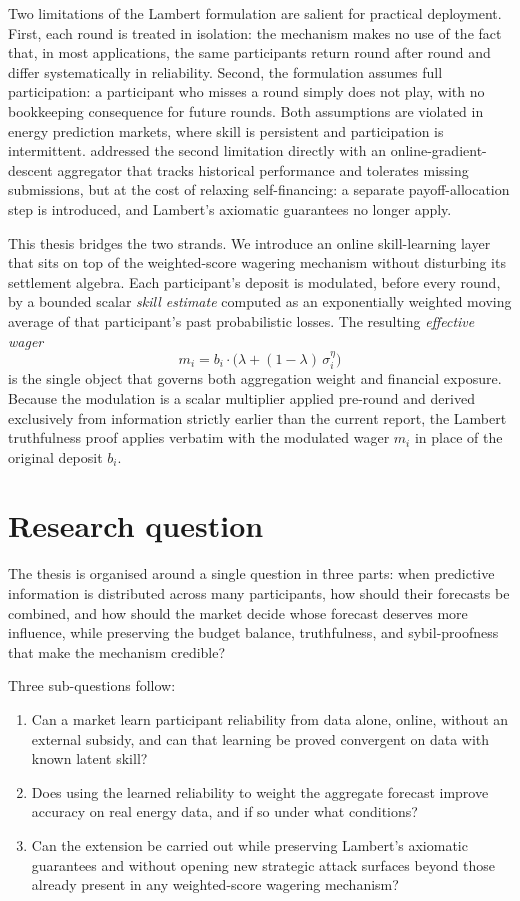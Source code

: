 \documentclass[
  11pt,
  a4paper,
  oneside]{report}
\begin{document}
Two limitations of the Lambert formulation are salient for practical
deployment. First, each round is treated in isolation: the mechanism
makes no use of the fact that, in most applications, the same
participants return round after round and differ systematically in
reliability. Second, the formulation assumes full participation: a
participant who misses a round simply does not play, with no bookkeeping
consequence for future rounds. Both assumptions are violated in energy
prediction markets, where skill is persistent and participation is
intermittent. \citet{vitali2025intermittent} addressed the second
limitation directly with an online-gradient-descent aggregator that
tracks historical performance and tolerates missing submissions, but at
the cost of relaxing self-financing: a separate payoff-allocation step
is introduced, and Lambert's axiomatic guarantees no longer apply.

This thesis bridges the two strands. We introduce an online
skill-learning layer that sits on top of the weighted-score wagering
mechanism without disturbing its settlement algebra. Each participant's
deposit is modulated, before every round, by a bounded scalar
\emph{skill estimate} computed as an exponentially weighted moving
average of that participant's past probabilistic losses. The resulting
\emph{effective wager} \[
  m_i = b_i \cdot \big(\lambda + (1-\lambda)\, \sigma_i^{\eta}\big)
\] is the single object that governs both aggregation weight and
financial exposure. Because the modulation is a scalar multiplier
applied pre-round and derived exclusively from information strictly
earlier than the current report, the Lambert truthfulness proof applies
verbatim with the modulated wager \(m_i\) in place of the original
deposit \(b_i\).

\section{Research question}\label{research-question}

The thesis is organised around a single question in three parts: when
predictive information is distributed across many participants, how
should their forecasts be combined, and how should the market decide
whose forecast deserves more influence, while preserving the budget
balance, truthfulness, and sybil-proofness that make the mechanism
credible?

Three sub-questions follow:

\begin{enumerate}
  \item Can a market learn participant reliability from data alone,
    online, without an external subsidy, and can that learning be
    proved convergent on data with known latent skill?
  \item Does using the learned reliability to weight the aggregate
    forecast improve accuracy on real energy data, and if so under
    what conditions?
  \item Can the extension be carried out while preserving Lambert's
    axiomatic guarantees and without opening new strategic attack
    surfaces beyond those already present in any weighted-score
    wagering mechanism?
\end{enumerate}
\end{document}
